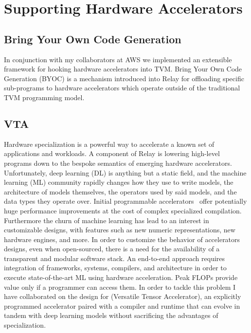 \section{Supporting Hardware Accelerators}
\label{sec:accel}

\subsection{Bring Your Own Code Generation}

In conjunction with my collaborators at AWS we implemented an
  extensible framework for hooking hardware accelerators into
  TVM.
Bring Your Own Code Generation (BYOC) is a mechanism introduced
  into Relay for offloading specific sub-programs to hardware
  accelerators which operate outside of the traditional TVM
  programming model.


\subsection{VTA}

Hardware specialization is a powerful way to accelerate
  a known set of applications and workloads.
A component of Relay is lowering high-level programs down
  to the bespoke semantics of emerging hardware accelerators.
Unfortunately, deep learning (DL) is anything but a static field, and the machine learning (ML) community
  rapidly changes how they use to write models, the architecture of models themselves, the operators
  used by said models, and the data types they operate over.
Initial programmable accelerators~\citep{tpuv1} offer potentially huge performance
  improvements at the cost of complex specialized compilation.
Furthermore the churn of machine learning has lead to an interest
  in customizable designs, with features such as new numeric representations,
  new hardware engines, and more.
In order to customize the behavior of accelerators designs, even when open-sourced,
  there is a need for the availability of a transparent and modular software stack.
An end-to-end approach requires integration of frameworks, systems, compilers,
  and architecture in order to execute state-of-the-art ML using hardware acceleration.
Peak FLOPs provide value only if a programmer can access them.
In order to tackle this problem I have collaborated on the design for \vta (Versatile Tensor Accelerator),
  an explicitly programmed accelerator paired with a compiler and runtime that can evolve
  in tandem with deep learning models without sacrificing the advantages of specialization.

